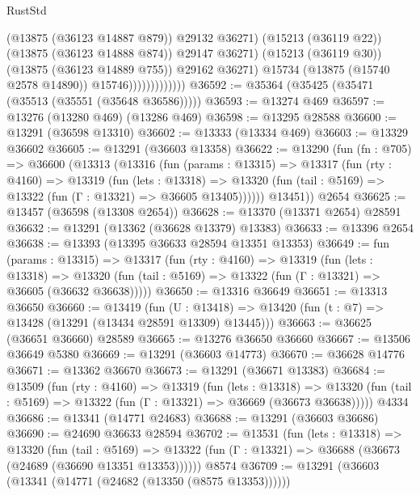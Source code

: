 \begin{lexlean}{RustStd}
\begin{coremodule}
                                    (@13875 (@36123 @14887 @879))
                                    @29132
                                    @36271)
                                  (@15213 (@36119 @22))
                                  (@13875 (@36123 @14888 @874))
                                  @29147
                                  @36271)
                                (@15213 (@36119 @30))
                                (@13875 (@36123 @14889 @755))
                                @29162
                                @36271)
                              @15734
                              (@13875 (@15740 @2578 @14890))
                              @15746)))))))))))))
@36592 := @35364 (@35425 (@35471 (@35513 (@35551 (@35648 @36586)))))
@36593 := @13274 @469
@36597 := @13276 (@13280 @469) (@13286 @469)
@36598 := @13295 @28588
@36600 := @13291 (@36598 @13310)
@36602 := @13333 (@13334 @469)
@36603 := @13329 @36602
@36605 := @13291 (@36603 @13358)
@36622 := @13290
    (fun (fn : @705) =>
    @36600
      (@13313
        (@13316
          (fun (params : @13315) =>
          @13317
            (fun (rty : @4160) =>
            @13319
              (fun (lets : @13318) =>
              @13320 (fun (tail : @5169) => @13322 (fun (Γ : @13321) => @36605 @13405))))))
        @13451))
    @2654
@36625 := @13457 (@36598 (@13308 @2654))
@36628 := @13370 (@13371 @2654) @28591
@36632 := @13291 (@13362 (@36628 @13379) @13383)
@36633 := @13396 @2654
@36638 := @13393 (@13395 @36633 @28594 @13351 @13353)
@36649 := fun (params : @13315) =>
  @13317
    (fun (rty : @4160) =>
    @13319
      (fun (lets : @13318) =>
      @13320 (fun (tail : @5169) => @13322 (fun (Γ : @13321) => @36605 (@36632 @36638)))))
@36650 := @13316 @36649
@36651 := @13313 @36650
@36660 := @13419
    (fun (U : @13418) => @13420 (fun (t : @7) => @13428 (@13291 (@13434 @28591 @13309) @13445)))
@36663 := @36625 (@36651 @36660) @28589
@36665 := @13276 @36650 @36660
@36667 := @13506 @36649 @5380
@36669 := @13291 (@36603 @14773)
@36670 := @36628 @14776
@36671 := @13362 @36670
@36673 := @13291 (@36671 @13383)
@36684 := @13509
    (fun (rty : @4160) =>
    @13319
      (fun (lets : @13318) =>
      @13320 (fun (tail : @5169) => @13322 (fun (Γ : @13321) => @36669 (@36673 @36638)))))
    @4334
@36686 := @13341 (@14771 @24683)
@36688 := @13291 (@36603 @36686)
@36690 := @24690 @36633 @28594
@36702 := @13531
    (fun (lets : @13318) =>
    @13320
      (fun (tail : @5169) =>
      @13322 (fun (Γ : @13321) => @36688 (@36673 (@24689 (@36690 @13351 @13353))))))
    @8574
@36709 := @13291 (@36603 (@13341 (@14771 (@24682 (@13350 (@8575 @13353))))))

\end{coremodule}
\end{lexlean}
